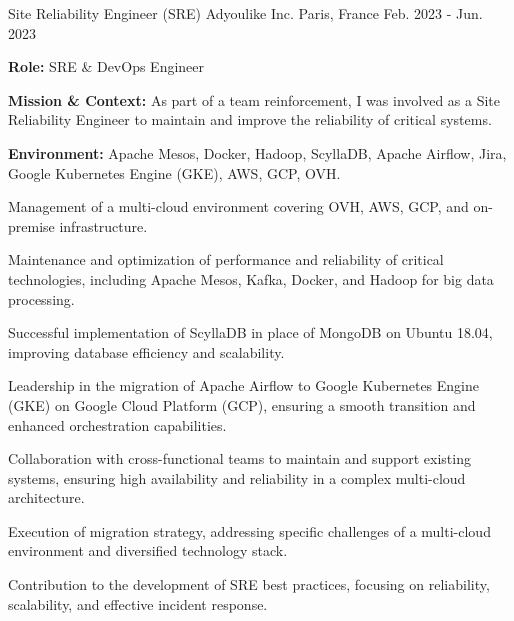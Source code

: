 \begin{cventries}
\cventry
{Site Reliability Engineer (SRE)} %
{Adyoulike Inc.} %
{Paris, France} %
{Feb. 2023 - Jun. 2023} %
{
  \begin{cvitems} %
    \item {\textbf{Role:} SRE \& DevOps Engineer}
    \item {\textbf{Mission \& Context:} As part of a team reinforcement, I was involved as a Site Reliability Engineer to maintain and improve the reliability of critical systems.}
    \item {\textbf{Environment:} Apache Mesos, Docker, Hadoop, ScyllaDB, Apache Airflow, Jira, Google Kubernetes Engine (GKE), AWS, GCP, OVH.}
    \item {Management of a multi-cloud environment covering OVH, AWS, GCP, and on-premise infrastructure.}
    \item {Maintenance and optimization of performance and reliability of critical technologies, including Apache Mesos, Kafka, Docker, and Hadoop for big data processing.}
    \item {Successful implementation of ScyllaDB in place of MongoDB on Ubuntu 18.04, improving database efficiency and scalability.}
    \item {Leadership in the migration of Apache Airflow to Google Kubernetes Engine (GKE) on Google Cloud Platform (GCP), ensuring a smooth transition and enhanced orchestration capabilities.}
    \item {Collaboration with cross-functional teams to maintain and support existing systems, ensuring high availability and reliability in a complex multi-cloud architecture.}
    \item {Execution of migration strategy, addressing specific challenges of a multi-cloud environment and diversified technology stack.}
    \item {Contribution to the development of SRE best practices, focusing on reliability, scalability, and effective incident response.}
  \end{cvitems}
}


\end{cventries}
